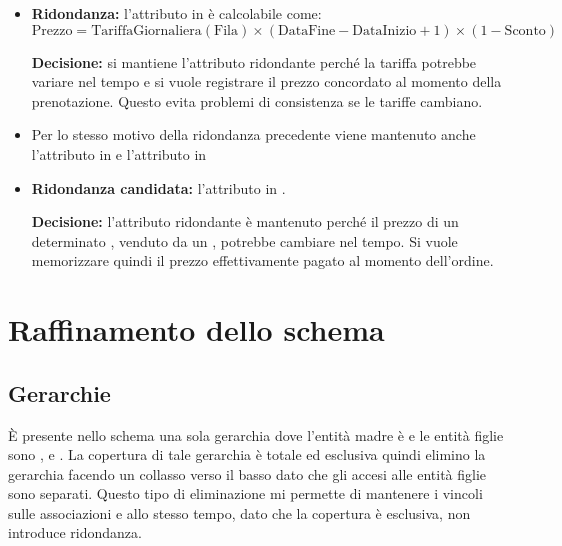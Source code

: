 \begin{itemize}
  \item \textbf{Ridondanza:} l'attributo  in
         \`{e} calcolabile come:
        \[
          \text{Prezzo} = \text{TariffaGiornaliera}(\text{Fila}) \times
          (\text{DataFine} - \text{DataInizio} + 1) \times (1 - \text{Sconto})
        \]

        \textbf{Decisione:} si mantiene l'attributo ridondante 
        perché la tariffa potrebbe variare nel tempo e si vuole registrare il prezzo
        concordato al momento della prenotazione. Questo evita problemi di consistenza
        se le tariffe cambiano.
  \item Per lo stesso motivo della ridondanza precedente viene mantenuto anche
        l'attributo  in  e l'attributo
         in 
  \item \textbf{Ridondanza candidata:} l'attributo 
        in .

        \textbf{Decisione:} l'attributo ridondante 
        è mantenuto perché il prezzo di un determinato ,
        venduto da un , potrebbe cambiare nel tempo.
        Si vuole memorizzare quindi il prezzo effettivamente pagato al momento
        dell'ordine.
\end{itemize}

\clearpage

\section{Raffinamento dello schema}

\subsection{Gerarchie}
\`{E} presente nello schema una sola gerarchia dove l'entità madre è 
e le entità figlie sono ,  e .
La copertura di tale gerarchia è totale ed esclusiva quindi elimino la gerarchia facendo
un collasso verso il basso dato che gli accesi alle entità figlie sono separati.
Questo tipo di eliminazione mi permette di mantenere i vincoli sulle associazioni e 
allo stesso tempo, dato che la copertura è esclusiva, non introduce ridondanza.


